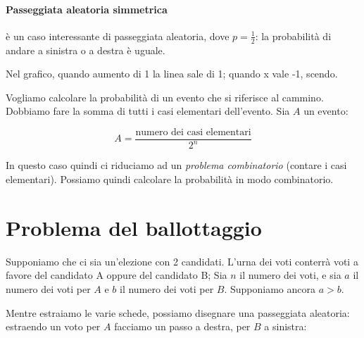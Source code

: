 \documentclass[a4paper,12pt]{book}
\begin{document}
\paragraph{Passeggiata aleatoria simmetrica} è un caso interessante di passeggiata aleatoria, dove $ p = \frac{1}{2} $: la probabilità di andare a sinistra o a destra è uguale. 

Nel grafico, quando aumento di 1 la linea sale di 1; quando x vale -1, scendo. 


Vogliamo calcolare la probabilità di un evento che si riferisce al cammino. Dobbiamo fare la somma di tutti i casi elementari dell'evento. Sia $ A $ un evento:

$$A = \frac{\text{numero dei casi elementari}}{2^n}$$

In questo caso quindi ci riduciamo ad un \textit{problema combinatorio} (contare i casi elementari). Possiamo quindi calcolare la probabilità in modo combinatorio. 

\section{Problema del ballottaggio}
Supponiamo che ci sia un'elezione con 2 candidati. L'urna dei voti conterrà voti a favore del candidato A oppure del candidato B; Sia $ n $ il numero dei voti, e sia $ a $ il numero dei voti per $ A $ e $ b $ il numero dei voti per $ B $.  Supponiamo ancora $ a > b $. 

Mentre estraiamo le varie schede, possiamo disegnare una passeggiata aleatoria: estraendo un voto per $ A $ facciamo un passo a destra, per $ B $ a sinistra:
\begin{center}
\end{center}
\end{document}
